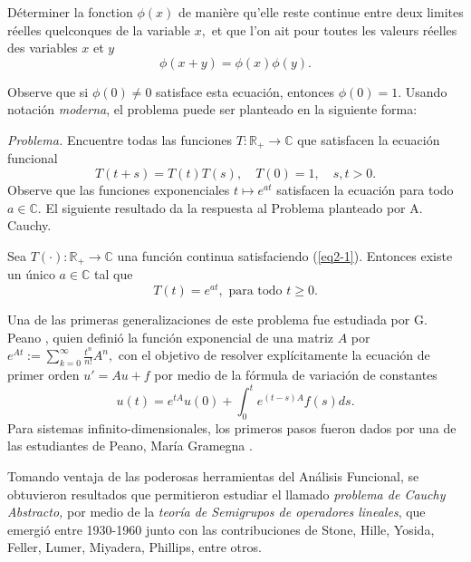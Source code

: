 \begin{titlepage}
\begin{minipage}{0.85\linewidth}
\begin{minipage}{0.85\linewidth}
\begin{resumen}
{\em
\begin{center}
D\'eterminer la fonction $\phi(x)$ de manière qu'elle reste continue entre deux
limites r\'eelles quelconques de la variable $x,$ et que l'on ait pour toutes
les valeurs r\'eelles des variables $x$ et $y$ $$\phi(x + y) = \phi(x)\phi(y).$$
\end{center}
}



Observe que si $\phi(0)\neq 0$ satisface esta ecuaci\'on, entonces $\phi(0)=1.$ Usando notaci\'on {\em moderna}, el problema puede ser planteado en la siguiente forma:

{\em Problema.} Encuentre todas las funciones $T:\mathbb{R}_+\to \mathbb{C}$ que satisfacen la ecuaci\'on funcional
\begin{equation}\label{eq2-1}
T(t+s)=T(t)T(s), \quad T(0)=1, \quad s,t>0.
\end{equation}
Observe que las funciones exponenciales $t\mapsto e^{at}$ satisfacen la ecuaci\'on para todo $a\in\mathbb{C}.$
El siguiente resultado da la respuesta al Problema planteado por A. Cauchy.

\begin{thm}
Sea $T(\cdot):\mathbb{R}_+\to \mathbb{C}$ una funci\'on continua satisfaciendo
(\ref{eq2-1}). Entonces existe un \'unico $a\in \mathbb{C}$ tal que $$T(t)=e^{at}, \mbox{ para todo } t\geq 0.$$
\end{thm}

Una de las primeras generalizaciones de este problema fue estudiada por G. Peano \cite{Pe-1888}, quien defini\'o la funci\'on exponencial de una matriz $A$ por $e^{At}:=\sum_{k=0}^\infty \frac{t^n}{n!}A^n,$ con el objetivo de resolver expl\'icitamente la ecuaci\'on de primer orden $u'=Au+f$ por medio de la f\'ormula de variaci\'on de constantes
$$u(t)=e^{tA}u(0)+\int_0^t e^{(t-s)A}f(s)ds.$$
Para sistemas infinito-dimensionales, los primeros pasos fueron dados por una de las estudiantes de Peano, Mar\'ia Gramegna \cite{Gr-1910}.

Tomando ventaja de las poderosas herramientas del An\'alisis Funcional, se obtuvieron resultados que permitieron estudiar el llamado {\em problema de Cauchy Abstracto,} por medio de la {\em teor\'ia de Semigrupos de operadores lineales}, que emergi\'o entre 1930-1960 junto con las contribuciones de Stone, Hille, Yosida, Feller, Lumer, Miyadera, Phillips, entre otros.






\end{resumen}
\end{minipage}
\end{minipage}
\end{titlepage}
